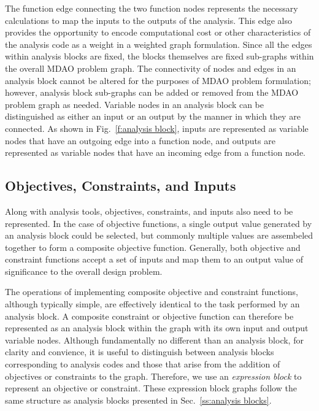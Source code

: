   The function edge connecting the two function nodes represents the necessary 
  calculations to map the inputs to the outputs of the analysis. 
  This edge also provides the opportunity to encode computational cost or other 
  characteristics of the analysis code as a weight in a weighted graph formulation. 
  Since all the edges within analysis blocks are fixed, the blocks themselves are fixed sub-graphs within the overall MDAO problem graph. 
  The connectivity of nodes and edges in an analysis block cannot be altered for the purposes of MDAO problem formulation; 
  however, analysis block sub-graphs can be added or removed from the MDAO problem graph as needed.
  Variable nodes in an analysis block can be distinguished as either an input or an output by the manner in which they are connected. 
  As shown in Fig.~\ref{f:analysis block}, inputs are represented as variable nodes that have an outgoing edge into a function node, and outputs are represented as variable nodes that have an incoming edge from a function node. 

\subsection{Objectives, Constraints, and Inputs}
  \label{ss:objectives and constraints}
  Along with analysis tools, objectives, constraints, and inputs also need to be represented.
  In the case of objective functions, a single output value generated by an analysis block could be selected, but commonly multiple values are assembeled together to form a composite objective function. 
  Generally, both objective and constraint functions accept a set of inputs and map them to an output value of significance to the overall design problem. 

  The operations of implementing composite objective and constraint functions, although typically simple, are effectively identical to the task performed by an analysis block. 
  A composite constraint or objective function can therefore be represented as an analysis block within the graph with its own input and output variable nodes. 
  Although fundamentally no different than an analysis block, for clarity and convience, it is useful to distinguish between analysis blocks corresponding to analysis codes and those that arise from the addition of objectives or constraints to the graph. 
  Therefore, we use an \emph{expression block} to represent an objective or constraint. 
  These expression block graphs follow the same structure as analysis blocks presented in Sec.~\ref{ss:analysis blocks}.

